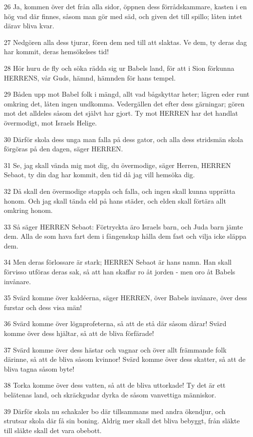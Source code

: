 \par 26 Ja, kommen över det från alla sidor, öppnen dess förrådskammare, kasten i en hög vad där finnes, såsom man gör med säd, och given det till spillo; låten intet därav bliva kvar.
\par 27 Nedgören alla dess tjurar, fören dem ned till att slaktas. Ve dem, ty deras dag har kommit, deras hemsökelses tid!
\par 28 Hör huru de fly och söka rädda sig ur Babels land, för att i Sion förkunna HERRENS, vår Guds, hämnd, hämnden för hans tempel.
\par 29 Båden upp mot Babel folk i mängd, allt vad bågskyttar heter; lägren eder runt omkring det, låten ingen undkomma. Vedergällen det efter dess gärningar; gören mot det alldeles såsom det självt har gjort. Ty mot HERREN har det handlat övermodigt, mot Israels Helige.
\par 30 Därför skola dess unga man falla på dess gator, och alla dess stridsmän skola förgöras på den dagen, säger HERREN.
\par 31 Se, jag skall vända mig mot dig, du övermodige, säger Herren, HERREN Sebaot, ty din dag har kommit, den tid då jag vill hemsöka dig.
\par 32 Då skall den övermodige stappla och falla, och ingen skall kunna upprätta honom. Och jag skall tända eld på hans städer, och elden skall förtära allt omkring honom.
\par 33 Så säger HERREN Sebaot: Förtryckta äro Israels barn, och Juda barn jämte dem. Alla de som hava fart dem i fångenskap hålla dem fast och vilja icke släppa dem.
\par 34 Men deras förlossare är stark; HERREN Sebaot är hans namn. Han skall förvisso utföras deras sak, så att han skaffar ro åt jorden - men oro åt Babels invånare.
\par 35 Svärd komme över kaldéerna, säger HERREN, över Babels invånare, över dess furstar och dess visa män!
\par 36 Svärd komme över lögnprofeterna, så att de stå där såsom dårar! Svärd komme över dess hjältar, så att de bliva förfärade!
\par 37 Svärd komme över dess hästar och vagnar och över allt främmande folk därinne, så att de bliva såsom kvinnor! Svärd komme över dess skatter, så att de bliva tagna såsom byte!
\par 38 Torka komme över dess vatten, så att de bliva uttorkade! Ty det är ett belätenas land, och skräckgudar dyrka de såsom vanvettiga människor.
\par 39 Därför skola nu schakaler bo där tillsammans med andra ökendjur, och strutsar skola där få sin boning. Aldrig mer skall det bliva bebyggt, från släkte till släkte skall det vara obebott.
